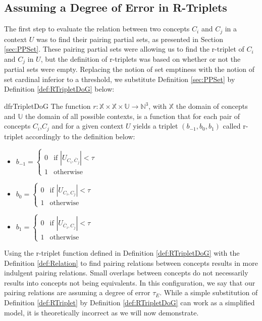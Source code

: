 \subsection{Assuming a Degree of Error in R-Triplets}
\label{sec:LPRassumingDoG}

The first step to evaluate the relation between two concepts $C_{i}$ and $C_{j}$ in a context $U$ was to find their pairing partial sets, as presented in Section \ref{sec:PPSet}. These pairing partial sets were allowing us to find the r-triplet of $C_{i}$ and $C_{j}$ in $U$, but the definition of r-triplets was based on whether or not the partial sets were empty. Replacing the notion of set emptiness with the notion of set cardinal inferior to a threshold, we substitute Definition \ref{sec:PPSet} by Definition \ref{def:RTripletDoG} below:

\begin{restatable}{df}{rTripletDoG}
\label{def:RTripletDoG}
The function $r: \mathbb{X} \times \mathbb{X} \times \mathbb{U} \rightarrow  \mathbb{N}^{3}$, with $\mathbb{X}$ the domain of concepts and $\mathbb{U}$ the domain of all possible contexts, is a function that for each pair of concepts $C_{i}$,$C_{j}$ and for a given context $U$ yields a triplet $(b_{-1},b_{0},b_{1})$ called r-triplet accordingly to the definition below:

\begin{itemize}
\item $b_{-1} = \left\{
	\begin{array}{ll}
		0  & \mbox{if } |U_{C_i,\overbar{C}_j}| < \tau \\
		1 & \mbox{otherwise}
	\end{array}
\right.$
\item $b_{0} = \left\{
	\begin{array}{ll}
		0  & \mbox{if } |U_{C_i,C_j}| < \tau \\
		1 & \mbox{otherwise}
	\end{array}
\right.$
\item $b_{1} = \left\{
	\begin{array}{ll}
		0  & \mbox{if } |U_{\overbar{C}_i,C_j}| < \tau \\
		1 & \mbox{otherwise}
	\end{array}
\right.$
\end{itemize}
\end{restatable}

Using the r-triplet function defined in Definition \ref{def:RTripletDoG} with the Definition \ref{def:Relation} to find pairing relations between concepts results in more indulgent pairing relations. Small overlaps between concepts do not necessarily results into concepts not being equivalents. In this configuration, we say that our pairing relations are assuming a degree of error $\tau_{E}$. While a simple substitution of Definition \ref{def:RTriplet} by Definition \ref{def:RTripletDoG} can work as a simplified model, it is theoretically incorrect as we will now demonstrate.

